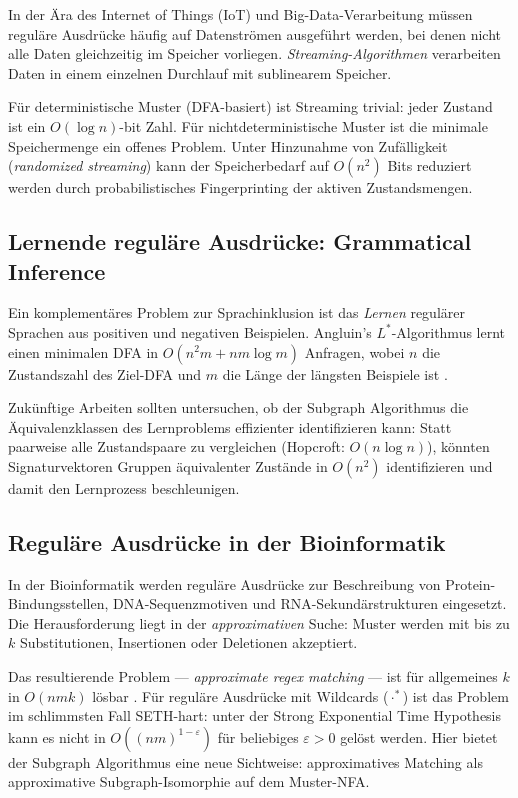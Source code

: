 ﻿\documentclass[a4paper,12pt]{article}
\theoremstyle{definition}
\begin{document}
In der Ära des Internet of Things (IoT) und Big-Data-Verarbeitung müssen reguläre
Ausdrücke häufig auf Datenströmen ausgeführt werden, bei denen nicht alle Daten
gleichzeitig im Speicher vorliegen. \emph{Streaming-Algorithmen} verarbeiten Daten
in einem einzelnen Durchlauf mit sublinearem Speicher.

Für deterministische Muster (DFA-basiert) ist Streaming trivial: jeder Zustand
ist ein $O(\log n)$-bit Zahl. Für nichtdeterministische Muster ist die minimale
Speichermenge ein offenes Problem. Unter Hinzunahme von Zufälligkeit (\emph{randomized
streaming}) kann der Speicherbedarf auf $O(n^2)$ Bits reduziert werden durch
probabilistisches Fingerprinting der aktiven Zustandsmengen.

\subsection{Lernende reguläre Ausdrücke: Grammatical Inference}

Ein komplementäres Problem zur Sprachinklusion ist das \emph{Lernen} regulärer
Sprachen aus positiven und negativen Beispielen. Angluin's $L^*$-Algorithmus
lernt einen minimalen DFA in $O(n^2 m + n m \log m)$ Anfragen, wobei $n$ die
Zustandszahl des Ziel-DFA und $m$ die Länge der längsten Beispiele ist \cite{angluin1987}.

Zukünftige Arbeiten sollten untersuchen, ob der Subgraph Algorithmus die
Äquivalenzklassen des Lernproblems effizienter identifizieren kann: Statt paarweise
alle Zustandspaare zu vergleichen (Hopcroft: $O(n \log n)$), könnten
Signaturvektoren Gruppen äquivalenter Zustände in $O(n^2)$ identifizieren
und damit den Lernprozess beschleunigen.

\subsection{Reguläre Ausdrücke in der Bioinformatik}

In der Bioinformatik werden reguläre Ausdrücke zur Beschreibung von
Protein-Bindungsstellen, DNA-Sequenzmotiven und RNA-Sekundärstrukturen eingesetzt.
Die Herausforderung liegt in der \emph{approximativen} Suche: Muster werden mit
bis zu $k$ Substitutionen, Insertionen oder Deletionen akzeptiert.

Das resultierende Problem --- \emph{approximate regex matching} --- ist für allgemeines
$k$ in $O(n m k)$ lösbar \cite{navarro2001}. Für reguläre Ausdrücke mit
Wildcards ($\cdot^*$) ist das Problem im schlimmsten Fall SETH-hart: unter der
Strong Exponential Time Hypothesis kann es nicht in $O((nm)^{1-\varepsilon})$
für beliebiges $\varepsilon > 0$ gelöst werden. Hier bietet der Subgraph
Algorithmus eine neue Sichtweise: approximatives Matching als approximative
Subgraph-Isomorphie auf dem Muster-NFA.
\end{document}
